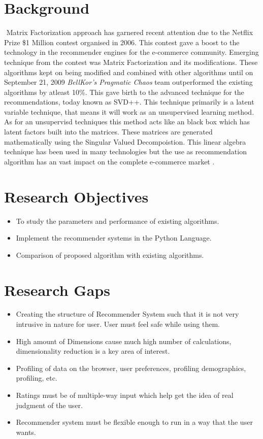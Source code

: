\section{Background}‌​‌​‌​‌​‌​‌​‌​‌​‌​‌​‌​‌​‌​‌​‌​‌​
Matrix Factorization approach has garnered recent attention due to the Netflix Prize \cite{Bennett2007} \$1 Million contest organised in 2006. This contest gave a boost to the technology in the recommender engines for the e-commerce community. Emerging technique from the contest was Matrix Factorization and its modifications. These algorithms kept on being modified and combined with other algorithms until on September 21, 2009 \textit{BellKor's Pragmatic Chaos} team outperformed the existing algorithms by atleast 10\%. This gave birth to the advanced technique for the recommendations, today known as SVD++. This technique primarily is a latent variable technique, that means it will work as an unsupervised learning method. As for an unsupervisd techniques this method acts like an black box which has latent factors built into the matrices. These matrices are generated mathematically using the Singular Valued Decompoistion. This linear algebra technique has been used in many technologies but the use as recommendation algorithm has an vast impact on the complete e-commerce market \cite{Koren2009}.

\section{Research Objectives}
\begin{itemize}
	\item To study the parameters and performance of existing algorithms.
	\item Implement the recommender systems in the Python Language.
	\item Comparison of proposed algorithm with existing algorithms.
\end{itemize}


\section{Research Gaps}
\begin{itemize}
\item Creating the structure of Recommender System such that it is not very intrusive in
nature for user. User must feel safe while using them.
\item High amount of Dimensions cause much high number of calculations, dimensionality
reduction is a key area of interest.
\item Profiling of data on the browser, user preferences, profiling demographics, profiling,
etc.
\item Ratings must be of multiple-way input which help get the idea of real judgment of
the user.
\item Recommender system must be flexible enough to run in a way that the user wants.
\end{itemize}
